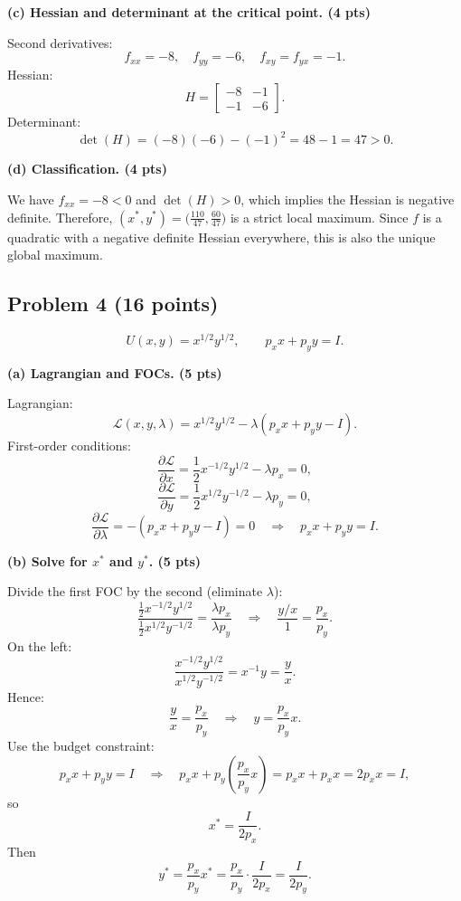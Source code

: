 \documentclass[12pt]{article}
\begin{document}
\textbf{(c) Hessian and determinant at the critical point. (4 pts)}

Second derivatives:
\[
f_{xx} = -8,\quad f_{yy} = -6,\quad f_{xy}=f_{yx} = -1.
\]
Hessian:
\[
H = \begin{bmatrix}
-8 & -1\\
-1 & -6
\end{bmatrix}.
\]
Determinant:
\[
\det(H) = (-8)(-6) - (-1)^2 = 48 - 1 = 47 > 0.
\]

\textbf{(d) Classification. (4 pts)}

We have \(f_{xx}=-8<0\) and \(\det(H)>0\), which implies the Hessian is negative definite. Therefore, \((x^\ast,y^\ast) = \big(\frac{110}{47}, \frac{60}{47}\big)\) is a strict local maximum. Since \(f\) is a quadratic with a negative definite Hessian everywhere, this is also the unique global maximum.

\bigskip

\subsection*{Problem 4 (16 points)}

\[
U(x,y)=x^{1/2}y^{1/2},\qquad p_x x + p_y y = I.
\]

\textbf{(a) Lagrangian and FOCs. (5 pts)}

Lagrangian:
\[
\mathcal{L}(x,y,\lambda) = x^{1/2}y^{1/2} - \lambda(p_x x + p_y y - I).
\]
First-order conditions:
\[
\frac{\partial \mathcal{L}}{\partial x}
= \frac{1}{2}x^{-1/2}y^{1/2} - \lambda p_x = 0,
\]
\[
\frac{\partial \mathcal{L}}{\partial y}
= \frac{1}{2}x^{1/2}y^{-1/2} - \lambda p_y = 0,
\]
\[
\frac{\partial \mathcal{L}}{\partial \lambda}
= -(p_x x + p_y y - I) = 0
\quad\Rightarrow\quad
p_x x + p_y y = I.
\]

\textbf{(b) Solve for \(x^\ast\) and \(y^\ast\). (5 pts)}

Divide the first FOC by the second (eliminate \(\lambda\)):
\[
\frac{\frac{1}{2}x^{-1/2}y^{1/2}}{\frac{1}{2}x^{1/2}y^{-1/2}}
= \frac{\lambda p_x}{\lambda p_y}
\quad\Rightarrow\quad
\frac{y/x}{1} = \frac{p_x}{p_y}.
\]
On the left:
\[
\frac{x^{-1/2}y^{1/2}}{x^{1/2}y^{-1/2}} 
= x^{-1} y = \frac{y}{x}.
\]
Hence:
\[
\frac{y}{x} = \frac{p_x}{p_y}
\quad\Rightarrow\quad
y = \frac{p_x}{p_y} x.
\]
Use the budget constraint:
\[
p_x x + p_y y = I
\quad\Rightarrow\quad
p_x x + p_y \left(\frac{p_x}{p_y}x\right) = p_x x + p_x x = 2 p_x x = I,
\]
so
\[
x^\ast = \frac{I}{2p_x}.
\]
Then
\[
y^\ast = \frac{p_x}{p_y} x^\ast
= \frac{p_x}{p_y}\cdot \frac{I}{2p_x}
= \frac{I}{2p_y}.
\]
\end{document}
